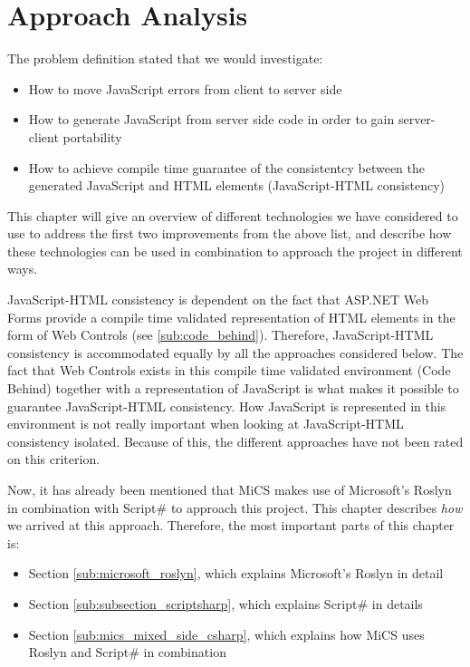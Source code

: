 \chapter{Approach Analysis}
	The problem definition stated that we would investigate:

	\begin{itemize}
		\item How to move JavaScript errors from client to server side
		\item How to generate JavaScript from server side code in order to gain server-client portability
		\item How to achieve compile time guarantee of the consistentcy between the generated JavaScript and HTML elements (JavaScript-HTML consistency)
	\end{itemize}

	This chapter will give an overview of different technologies we have considered to use to address the first two improvements from the above list, and describe how these technologies can be used in combination to approach the project in different ways.

	JavaScript-HTML consistency is dependent on the fact that ASP.NET Web Forms provide a compile time validated representation of HTML elements in the form of Web Controls (see \ref{sub:code_behind}). Therefore, JavaScript-HTML consistency is accommodated equally by all the approaches considered below. The fact that Web Controls exists in this compile time validated environment (Code Behind) together with a representation of JavaScript is what makes it possible to guarantee JavaScript-HTML consistency. How JavaScript is represented in this environment is not really important when looking at JavaScript-HTML consistency isolated. Because of this, the different approaches have not been rated on this criterion.

	Now, it has already been mentioned that MiCS makes use of Microsoft's Roslyn in combination with Script\# to approach this project. This chapter describes \emph{how} we arrived at this approach. Therefore, the most important parts of this chapter is:

	\begin{itemize}
		\item Section \ref{sub:microsoft_roslyn}, which explains Microsoft's Roslyn in detail
		\item Section \ref{sub:subsection_scriptsharp}, which explains Script\# in details
		\item Section \ref{sub:mics_mixed_side_csharp}, which explains how MiCS uses Roslyn and Script\# in combination
	\end{itemize}

